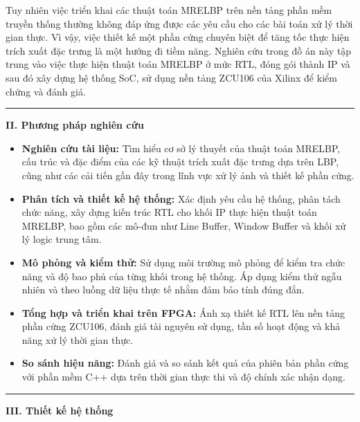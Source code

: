 Tuy nhiên việc triển khai các thuật toán MRELBP trên nền tảng phần mềm truyền thống thường không đáp ứng được các yêu cầu cho các bài toán xử lý thời gian thực. Vì vậy, việc thiết kế một phần cứng chuyên biệt để tăng tốc thực hiện trích xuất đặc trưng là một hướng đi tiềm năng. Nghiên cứu trong đồ án này tập trung vào việc thực hiện thuật toán MRELBP ở mức RTL, đóng gói thành IP và sau đó xây dựng hệ thống SoC, sử dụng nền tảng ZCU106 của Xilinx để kiểm chứng và đánh giá. 

\noindent\rule{\linewidth}{0.5pt} %

\vspace{0.5em} %
\noindent\textbf{II. \hspace{0.5em} Phương pháp nghiên cứu} 


\begin{itemize}
	\item \textbf{Nghiên cứu tài liệu:} Tìm hiểu cơ sở lý thuyết của thuật toán MRELBP, cấu trúc và đặc điểm của các kỹ thuật trích xuất đặc trưng dựa trên LBP, cũng như các cải tiến gần đây trong lĩnh vực xử lý ảnh và thiết kế phần cứng.
	
	\item \textbf{Phân tích và thiết kế hệ thống:} Xác định yêu cầu hệ thống, phân tách chức năng, xây dựng kiến trúc RTL cho khối IP thực hiện thuật toán MRELBP, bao gồm các mô-đun như Line Buffer, Window Buffer và khối xử lý logic trung tâm.
	
	\item \textbf{Mô phỏng và kiểm thử:} Sử dụng môi trường mô phỏng để kiểm tra chức năng và độ bao phủ của từng khối trong hệ thống. Áp dụng kiểm thử ngẫu nhiên và theo luồng dữ liệu thực tế nhằm đảm bảo tính đúng đắn.
	
	\item \textbf{Tổng hợp và triển khai trên FPGA:} Ánh xạ thiết kế RTL lên nền tảng phần cứng ZCU106, đánh giá tài nguyên sử dụng, tần số hoạt động và khả năng xử lý thời gian thực.
	
	\item \textbf{So sánh hiệu năng:} Đánh giá và so sánh kết quả của phiên bản phần cứng với phần mềm C++ dựa trên thời gian thực thi và độ chính xác nhận dạng.
\end{itemize}

\noindent\rule{\linewidth}{0.5pt} %

\vspace{0.5em} %
\noindent\textbf{III. \hspace{0.5em} Thiết kế hệ thống}

